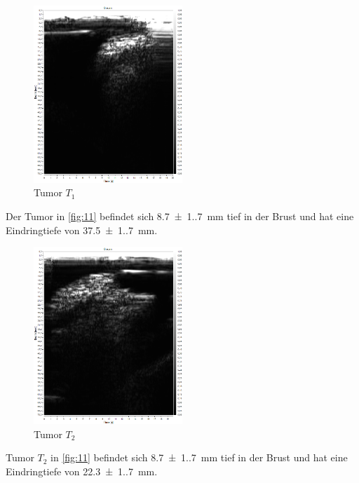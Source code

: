\begin{figure}
  \centering
  \caption{Tumor $T_1$}
  \label{fig:11}
  \includegraphics[width=0.5\textwidth]{Bilder/BrustA1.png}
\end{figure}
Der Tumor in \autoref{fig:11} befindet sich \qty{8.7(1.7)}{\mm} tief
in der Brust und hat eine Eindringtiefe von \qty{37.5(1.7)}{\mm}.
\begin{figure}
  \centering
  \caption{Tumor $T_2$}
  \label{fig:12}
  \includegraphics[width=0.5\textwidth]{Bilder/BrustB1.png}
\end{figure}
Tumor $T_2$ in \autoref{fig:11} befindet sich \qty{8.7(1.7)}{\mm} tief
in der Brust und hat eine Eindringtiefe von \qty{22.3(1.7)}{\mm}.


